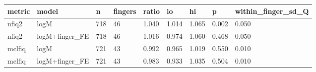\begin{tabular}{lllllllll}
\hline
metric & model & n & fingers & ratio & lo & hi & p & within\_finger\_sd\_Q \\
\hline
nfiq2 & logM & 718 & 46 & 1.040 & 1.014 & 1.065 & 0.002 & 0.050 \\
nfiq2 & logM+finger\_FE & 718 & 46 & 1.016 & 0.974 & 1.060 & 0.468 & 0.050 \\
mclfiq & logM & 721 & 43 & 0.992 & 0.965 & 1.019 & 0.550 & 0.010 \\
mclfiq & logM+finger\_FE & 721 & 43 & 0.983 & 0.933 & 1.035 & 0.504 & 0.010 \\
\hline
\end{tabular}
